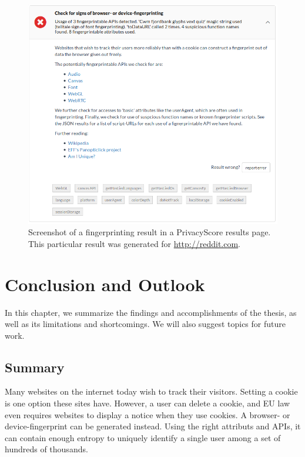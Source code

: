 \documentclass[
    fontsize=12pt,
    headings=small,
    parskip=half,
    bibliography=totoc,
    numbers=noenddot,
    open=any
    ]{scrreprt}
\begin{document}
\begin{figure}
\centering
\includegraphics[scale=0.5]{images/privacyscore.png}
\caption{Screenshot of a fingerprinting result in a PrivacyScore results page. This particular result was generated for \url{http://reddit.com}.}
\label{image:privacyscore}
\end{figure}



\chapter{Conclusion and Outlook}
\label{chap:conclusion}
In this chapter, we summarize the findings and accomplishments of the thesis,
as well as its limitations and shortcomings. We will also suggest topics for future work.

\section{Summary}
Many websites on the internet today wish to track their visitors. Setting a cookie
is one option these sites have. However, a user can delete a cookie, and EU law
even requires websites to display a notice when they use cookies.
A browser- or device-fingerprint can be generated instead. Using the right attributs
and APIs, it can contain enough entropy to uniquely identify a single user among a set
of hundreds of thousands.
\end{document}
